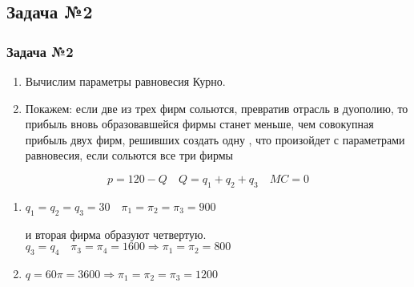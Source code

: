 \documentclass {beamer}
\begin{document}
\begin{frame}
\section{Задача №2}
\frametitle{Задача №2}
\begin{enumerate}
\item Вычислим параметры равновесия Курно. 
\item Покажем: если две из трех фирм сольются, превратив отрасль в дуополию, то прибыль вновь образовавшейся фирмы станет меньше, чем совокупная прибыль двух фирм, решивших создать одну
, что произойдет с параметрами равновесия, если сольются все три фирмы 
\end{enumerate}
\begin{block}
{$$p=120-Q \quad Q=q_1+q_2+q_3 \quad MC=0$$}
\begin{enumerate}
\item$q_1=q_2=q_3=30\quad\pi_1=\pi_2=\pi_3=900$


 и вторая фирма образуют четвертую. \\$q_3=q_4\quad \pi_3=\pi_4=1600 \Longrightarrow \pi_1 =\pi_2=800$



\item  $q=60 \pi=3600 \Longrightarrow \pi_1=\pi_2=\pi_3=1200$
\end{enumerate}
\end{block}
\end{frame}
\end{document}
